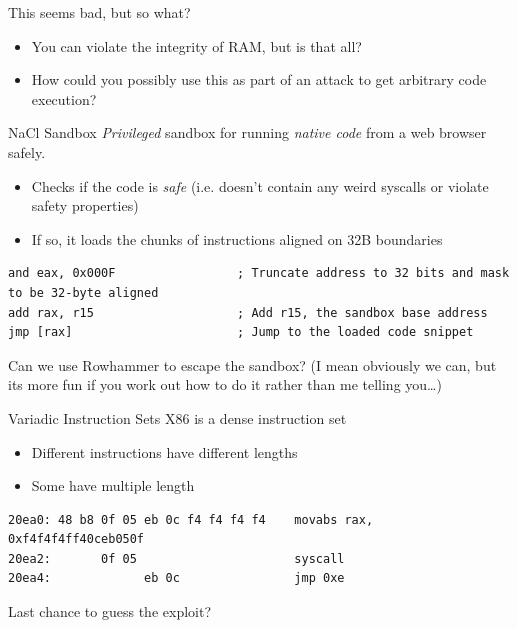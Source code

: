 \documentclass[9pt,aspectratio=169]{beamer}
\begin{document}
\begin{frame}[label={sec:orgce2ddae}]{This seems bad, but so what?}
\begin{itemize}
\item You can violate the integrity of RAM, but is that all?
\item How could you possibly use this as part of an attack to get arbitrary code execution?
\end{itemize}
\end{frame}

\begin{frame}[label={sec:orgaef14d4},fragile]{NaCl Sandbox}
 \emph{Privileged} sandbox for running \emph{native code} from a web browser safely.
\begin{itemize}
\item Checks if the code is \emph{safe} (i.e. doesn't contain any weird syscalls or violate safety properties)
\item If so, it loads the chunks of instructions aligned on 32B boundaries
\end{itemize}

\begin{verbatim}
and eax, 0x000F                 ; Truncate address to 32 bits and mask to be 32-byte aligned
add rax, r15                    ; Add r15, the sandbox base address
jmp [rax]                       ; Jump to the loaded code snippet
\end{verbatim}

\vfill
\begin{block}{Can we use Rowhammer to escape the sandbox?}
\footnotesize
(I mean obviously we can, but its more fun if you work out how to do
it rather than me telling you\ldots{})
\end{block}
\end{frame}


\begin{frame}[label={sec:orgf40f050},fragile]{Variadic Instruction Sets}
 X86 is a dense instruction set
\begin{itemize}
\item Different instructions have different lengths
\item Some have multiple length
\end{itemize}

\begin{verbatim}
20ea0: 48 b8 0f 05 eb 0c f4 f4 f4 f4    movabs rax, 0xf4f4f4ff40ceb050f
20ea2:       0f 05                      syscall
20ea4:             eb 0c                jmp 0xe
\end{verbatim}

\begin{block}{Last chance to guess the exploit?}
\end{block}
\end{frame}
\end{document}
